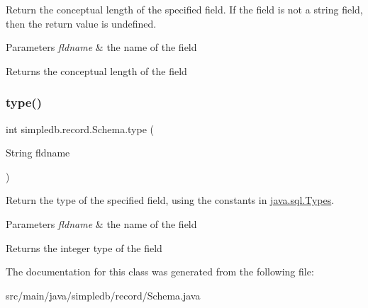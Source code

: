 Return the conceptual length of the specified field. If the field is not a string field, then the return value is undefined. 
\begin{DoxyParams}{Parameters}
{\em fldname} & the name of the field \\
\hline
\end{DoxyParams}
\begin{DoxyReturn}{Returns}
the conceptual length of the field 
\end{DoxyReturn}
\mbox{\label{classsimpledb_1_1record_1_1Schema_a2fe42c01b7fc3c09b25ef1d1d87a48a8}} 
\subsubsection{\texorpdfstring{type()}{type()}}
{\footnotesize\ttfamily int simpledb.\+record.\+Schema.\+type (\begin{DoxyParamCaption}\item[{String}]{fldname }\end{DoxyParamCaption})\hspace{0.3cm}{\ttfamily [inline]}}

Return the type of the specified field, using the constants in \hyperlink{}{java.\+sql.\+Types}. 
\begin{DoxyParams}{Parameters}
{\em fldname} & the name of the field \\
\hline
\end{DoxyParams}
\begin{DoxyReturn}{Returns}
the integer type of the field 
\end{DoxyReturn}


The documentation for this class was generated from the following file\+:\begin{DoxyCompactItemize}
\item 
src/main/java/simpledb/record/Schema.\+java\end{DoxyCompactItemize}
